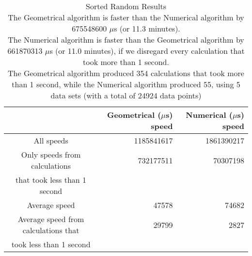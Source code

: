 \begin{table}[bth!]\footnotesize
 \begin{tabular}[3]{c|r|r}
 & Geometrical ($\mu$s) speed & Numerical ($\mu$s) speed\\
\hline
All speeds & 1185841617 & 1861390217 \\ 
\hline 
Only speeds from calculations & 732177511 & 70307198 \\ 
that took less than 1 second & & \\ 
\hline
Average speed & 47578 & 74682 \\
\hline
Average speed from calculations that & 29799 & 2827 \\ 
took less than 1 second & & \\ 
\end{tabular}\\ \\
\caption{Sorted Random Results\\
The Geometrical algorithm is faster than the Numerical algorithm by 675548600 $\mu$s (or 11.3 minutes).\\
The Numerical algorithm is faster than the Geometrical algorithm by 661870313 $\mu$s (or 11.0 minutes), if we disregard every calculation that took more than 1 second.\\
The Geometrical algorithm produced 354 calculations that took more than 1 second, while the Numerical algorithm produced 55, using 5 data sets (with a total of 24924 data points)\\
}\label{random-normal_speedtable}\end{table}